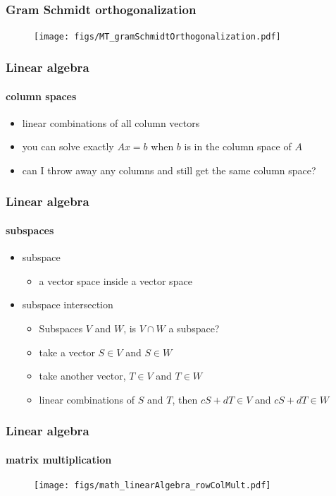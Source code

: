 \begin{frame}
\frametitle{\small{Gram Schmidt orthogonalization}}
\framesubtitle{}
\logoCSIPCPL\mypagenum\mypagenum
	\begin{figure}				
		\texttt{[image: figs/MT\_gramSchmidtOrthogonalization.pdf]}
	\end{figure}	
\end{frame}

\begin{frame}
\frametitle{Linear algebra}
\framesubtitle{column spaces}
\logoCSIPCPL\mypagenum\mypagenum
	\begin{itemize}
		\item linear combinations of all column vectors
		\item you can solve exactly $Ax=b$ when $b$ is in the column space of $A$
		\item can I throw away any columns and still get the same column space?
	\end{itemize}
\end{frame}




\begin{frame}
\frametitle{Linear algebra}
\framesubtitle{subspaces}
\logoCSIPCPL\mypagenum\mypagenum
	\begin{itemize}
		\item {\color{red} subspace}
			\begin{itemize} 
				\item a vector space inside a vector space		
			\end{itemize}
		\item {\color{red} subspace intersection}
			\begin{itemize}
				\item Subspaces $V$ and $W$, is $V \cap W$ a subspace?
				\item take a vector $S \in V$ and $S \in W$
				\item take another vector, $T \in V$ and $T \in W$
				\item linear combinations of $S$ and $T$, then $cS + dT \in V$ and $cS + dT \in W$
			\end{itemize}
	\end{itemize}
\end{frame}


\begin{frame}
\frametitle{Linear algebra}
\framesubtitle{matrix multiplication}
\logoCSIPCPL\mypagenum\mypagenum
	\begin{figure}				
		\texttt{[image: figs/math\_linearAlgebra\_rowColMult.pdf]}
	\end{figure}
\end{frame}


